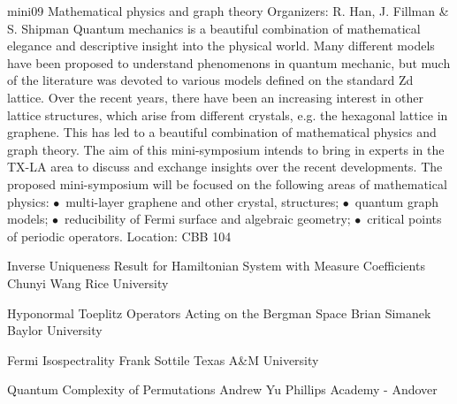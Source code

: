 \mini
{mini09}
{Mathematical physics and graph theory}
{Organizers: R. Han, J. Fillman \& S. Shipman}
{Quantum mechanics is a beautiful combination of mathematical elegance and descriptive insight into the physical world. Many different models have been proposed to understand phenomenons in quantum mechanic, but much of the literature was devoted to various models defined on the standard Zd lattice. Over the recent years, there have been an increasing interest in other lattice structures, which arise from different crystals, e.g. the hexagonal lattice in graphene. This has led to a beautiful combination of mathematical physics and graph theory. The aim of this mini-symposium intends to bring in experts in the TX-LA area to discuss and exchange insights over the recent developments. The proposed mini-symposium will be focused on the following areas of mathematical physics: $\bullet$~multi-layer graphene and other crystal,  structures; $\bullet$~quantum graph models; $\bullet$~reducibility of Fermi surface and algebraic geometry; $\bullet$~critical points of periodic operators.}
{Location: CBB 104}

\begin{talks}
\item\talk
{Inverse Uniqueness Result for Hamiltonian System with Measure Coefficients}
{Chunyi Wang}
{Rice University}
\item\talk
{Hyponormal Toeplitz Operators Acting on the Bergman Space}
{Brian Simanek}
{Baylor University}
\item\talk
{Fermi Isospectrality}
{Frank Sottile}
{Texas A\&M University}
\item\talk
{Quantum Complexity of Permutations}
{Andrew Yu}
{Phillips Academy - Andover}
\end{talks}
\room
